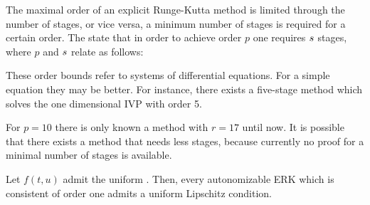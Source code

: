 \begin{remark}
  The maximal order of an explicit Runge-Kutta method is limited
  through the number of stages, or vice versa, a minimum number of
  stages is required for a certain order. The  state
  that in order to achieve order $p$ one requires $s$ stages, where
  $p$ and $s$ relate as follows:
  \begin{center}
    
  \end{center}
  
  These order bounds refer to systems of differential equations.  For
  a simple equation they may be better. For instance, there exists a
  five-stage method which solves the one dimensional IVP with order 5.

  For $p = 10$ there is only known a method with $r = 17$ until now.
  It is possible that there exists a method that needs less stages,
  because currently no proof for a minimal number of stages is
  available.
\end{remark}

\begin{lemma}
  Let $f(t,u)$ admit the uniform . Then,
  every autonomizable ERK which is consistent of order one admits a
  uniform Lipschitz condition.
\end{lemma}

